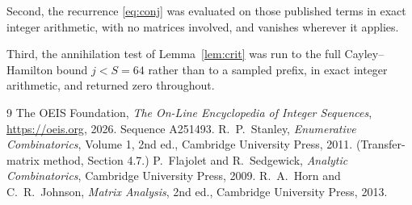 \documentclass[11pt,a4paper]{article}
\theoremstyle{plain}
\theoremstyle{definition}
\begin{document}
Second, the recurrence \eqref{eq:conj} was evaluated on those published terms in exact
integer arithmetic, with no matrices involved, and vanishes wherever it applies.

Third, the annihilation test of Lemma~\ref{lem:crit} was run to the full Cayley--Hamilton
bound $j<S=64$ rather than to a sampled prefix, in exact integer arithmetic, and returned
zero throughout.

\begin{thebibliography}{9}
 The OEIS Foundation, \emph{The On-Line Encyclopedia of Integer
Sequences}, \url{https://oeis.org}, 2026. Sequence A251493.
 R.~P.~Stanley, \emph{Enumerative Combinatorics}, Volume 1, 2nd ed.,
Cambridge University Press, 2011. (Transfer-matrix method, Section 4.7.)
 P.~Flajolet and R.~Sedgewick, \emph{Analytic Combinatorics}, Cambridge
University Press, 2009.
 R.~A.~Horn and C.~R.~Johnson, \emph{Matrix Analysis}, 2nd ed., Cambridge
University Press, 2013.
\end{thebibliography}
\end{document}
